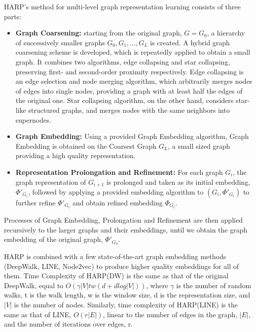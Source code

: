 HARP's method for multi-level graph representation learning consists of three parts:
\begin{itemize}
    \item \textbf{Graph Coarsening:} starting from the original graph, $G = G_0$, a hierarchy of successively smaller graphs $G_0, G_1, \dots , G_L$ is created. A hybrid graph coarsening scheme is developed, which is repeatedly applied to obtain a small graph. It combines two algorithms, edge collapsing and star collapsing, preserving first- and second-order proximity respectively. Edge collapsing is an edge selection and node merging algorithm, which arbitrarily merges nodes of edges into single nodes, providing a graph with at least half the edges of the original one. Star collapsing algorithm, on the other hand, considers star-like structured graphs, and merges nodes with the same neighbors into supernodes.
    \item \textbf{Graph Embedding:}  Using a provided Graph Embedding algorithm, Graph Embedding is obtained on the Coarsest Graph $G_L$, a small sized graph providing a high quality representation.
    \item \textbf{Representation Prolongation and Refinement:} For each graph $G_i$, the graph representation of $G_{i+1}$ is prolonged and taken as its initial embedding, $\Phi'_{G_i}$, followed by applying a provided embedding algorithm to $(G_i, \Phi'_{G_i})$ to further refine $\Phi'_{G_i}$ and obtain refined embedding $\Phi_{G_i}$.
\end{itemize}

Processes of Graph Embedding, Prolongation and Refinement are then applied recursively to the larger graphs and their embeddings, until we obtain the graph embedding of the original graph, $\Phi'_{G_0}$.

HARP is combined with a few state-of-the-art graph embedding methods (DeepWalk, LINE, Node2vec) to produce higher quality embeddings for all of them.
Time Complexity of HARP(DW) is the same as that of the original DeepWalk, equal to $O(\gamma |V|tw (d+dlog|V|))$, where $\gamma$ is the number of random walks, t is the  walk length, w is the window size, d is the representation size, and $|V|$ is the number of nodes. Similarly, time complexity of HARP(LINE) is the same as that of LINE, $O(r|E|)$,  linear to the number of edges in the graph, $|E|$, and the number of iterations over edges, r.
